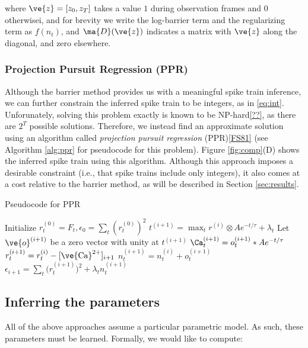 \documentclass[12pt]{article}
\begin{document}
\noindent where $\ve{z}=[z_0,z_T]$ takes a value $1$ during observation frames
and $0$ otherwisei, and for brevity we write the log-barrier term and the
regularizing term as $f(n_t)$, and $\ma{D}(\ve{z})$ indicates a matrix with
$\ve{z}$ along the diagonal, and zero elsewhere.

\subsubsection{Projection Pursuit Regression (PPR)}

Although the barrier method provides us with a meaningful spike train inference, we can further constrain the inferred spike train to be integers, as in \eqref{eq:int}.  Unforunately, solving this problem exactly is known to be NP-hard\ref{??}, as there are $2^T$ possible solutions.  Therefore, we instead find an approximate solution using  an algorithm called \emph{projection pursuit regression} (PPR)\ref{FS81} (see Algorithm \ref{alg:ppr} for pseudocode for this problem).  Figure \ref{fig:comp}(D) shows the inferred spike train using this algorithm. Although this approach imposes a desirable constraint (i.e., that spike trains include only integers), it also comes at a cost relative to the barrier method, as will be described in Section \ref{sec:results}.

\begin{algorithm}
\caption{Pseudocode for PPR}
\label{alg:ppr}
\begin{algorithmic}
\STATE Initialize $r^{(0)}_t=F_t, \epsilon_0 = \sum_t (r^{(0)}_t)^2$
\STATE $t^{(i+1)}=\max_t r^{(i)} \otimes A e^{-t/\tau} + \lambda_t$
\STATE Let $\ve{o}^{(i+1)}$ be a zero vector with unity at $t^{(i+1)}$
\STATE $\Ca^{(i+1)}_t =  o^{(i+1)}_t \ast A e^{-t/\tau}$
\STATE $r^{(i+1)}_t = r^{(i)}_t -  [\ve{\text{Ca}}^{2+}]_{i+1}$
\STATE $n^{(i+1)}_t = n^{(i)}_t + o^{(i+1)}_t$
\STATE $\epsilon_{i+1} = \sum_t \big(r^{(i+1)}_t\big)^2 + \lambda_t n^{(i+1)}_t$
\ENDWHILE
\end{algorithmic}
\end{algorithm}


\subsection{Inferring the parameters}

All of the above approaches assume a particular parametric model.  As such,
these parameters must be learned.  Formally, we would like to compute:
\end{document}
